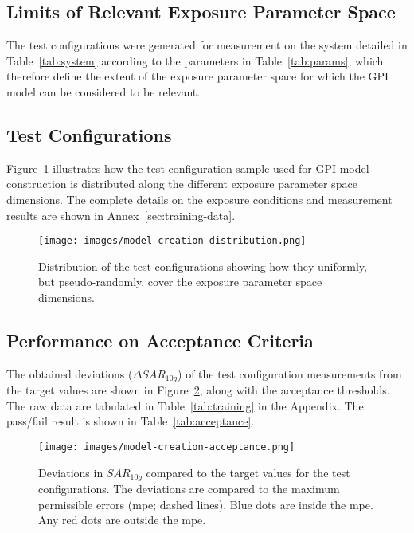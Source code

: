 \documentclass{article}
\begin{document}
\subsection{Limits of Relevant Exposure Parameter Space}
The test configurations were generated for measurement on the system detailed in Table~\ref{tab:system} according to the parameters in Table~\ref{tab:params}, which therefore define the extent of the exposure parameter space for which the GPI model can be considered to be relevant.



\FloatBarrier
\subsection{Test Configurations}

Figure~\ref{fig:training-dist} illustrates how the test configuration sample used for GPI model construction is distributed along the different exposure parameter space dimensions. The complete details on the exposure conditions and measurement results are shown in Annex~\ref{sec:training-data}.

\begin{figure} \centering
\texttt{[image: images/model-creation-distribution.png]}
\caption{Distribution of the test configurations showing how they uniformly, but pseudo-randomly, cover the exposure parameter space dimensions.} \label{fig:training-dist}
\end{figure}

\FloatBarrier
\subsection{Performance on Acceptance Criteria}
The obtained deviations ($\Delta SAR_{10g}$) of the test configuration measurements from the target values are shown in Figure~\ref{fig:creation-acc}, along with the acceptance thresholds. The raw data are tabulated in Table~\ref{tab:training} in the Appendix.
The pass/fail result is shown in Table~\ref{tab:acceptance}.



\begin{figure}[H] \centering
\texttt{[image: images/model-creation-acceptance.png]}
\caption{Deviations in $SAR_{10g}$ compared to the target values for the test configurations. The deviations are compared to the maximum permissible errors (mpe; dashed lines). Blue dots are inside the mpe. Any red dots are outside the mpe.} \label{fig:creation-acc}
\end{figure}
\end{document}
